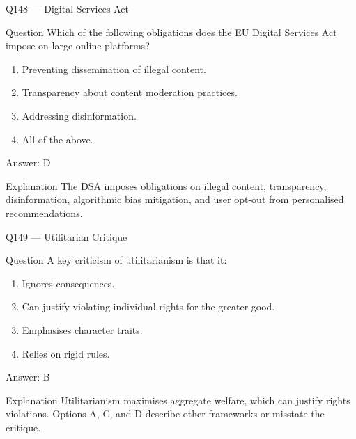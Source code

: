 \documentclass[aspectratio=169,8pt]{beamer}
\begin{document}
\begin{frame}{Q148 --- Digital Services Act}
\begin{block}{Question}
Which of the following obligations does the EU Digital Services Act impose on large online platforms?
\begin{enumerate}
\item Preventing dissemination of illegal content.
\item Transparency about content moderation practices.
\item Addressing disinformation.
\item All of the above.
\end{enumerate} 	\end{block}
\begin{exampleblock}{Answer: D}\end{exampleblock}
\begin{block}{Explanation}
The DSA imposes obligations on illegal content, transparency, disinformation, algorithmic bias mitigation, and user opt-out from personalised recommendations.
\end{block}
\end{frame}

\begin{frame}{Q149 --- Utilitarian Critique}
\begin{block}{Question}
A key criticism of utilitarianism is that it:
\begin{enumerate}
\item Ignores consequences.
\item Can justify violating individual rights for the greater good.
\item Emphasises character traits.
\item Relies on rigid rules.
\end{enumerate} 	\end{block}
\begin{exampleblock}{Answer: B}\end{exampleblock}
\begin{block}{Explanation}
Utilitarianism maximises aggregate welfare, which can justify rights violations. Options A, C, and D describe other frameworks or misstate the critique.
\end{block}
\end{frame}
\end{document}
